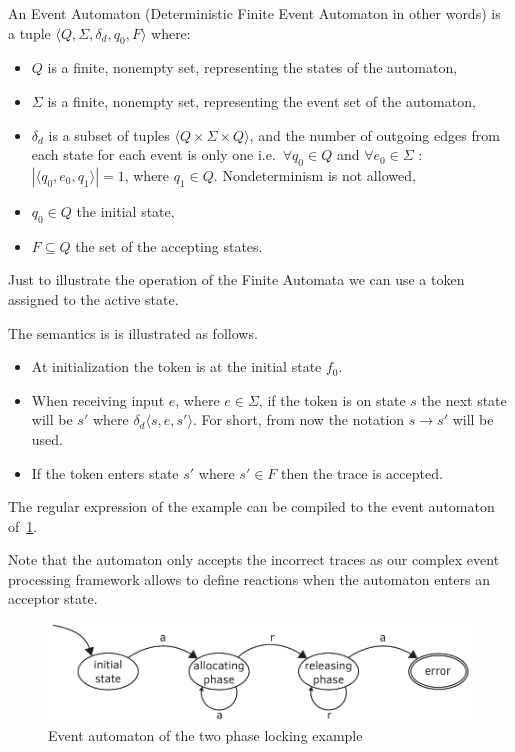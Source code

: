 			
			\begin{dfn}
				\label{dfn:cep:ea}
				An Event Automaton (Deterministic Finite Event Automaton in other words) is a tuple $\langle Q,\Sigma,\delta_d,q_0, F \rangle$\citep{lam2006compilers} where: 
					\begin{itemize}
						\item $Q$ is a finite, nonempty set, representing the states of the automaton,
						\item $\Sigma$ is a finite, nonempty set, representing the event set of the automaton,
						\item $\delta_d$ is a subset of tuples $\langle Q \times \Sigma \times Q \rangle$,
							and the number of outgoing edges from each state for each event is only one 
							i.e.~$\forall q_0 \in Q$ and $\forall e_0 \in \Sigma$ : $|\langle q_0, e_0, q_1 \rangle| = 1$, where $q_1 \in Q$. Nondeterminism is not allowed,
						\item $q_0 \in Q$ the initial state,
						\item $F \subseteq Q$ the set of the accepting states.
					\end{itemize}	
			\end{dfn}
			
			Just to illustrate the operation of the Finite Automata we can use a token assigned to the active state.

			The semantics is is illustrated as follows. 
			\begin{itemize}
				\item At initialization the token is at the initial state $f_0$.
				\item When receiving input $e$, where $e \in \Sigma$, if the token is on state $s$ the next state will be $s'$ where
				$\delta_d \langle s,e,s' \rangle$. For short, from now the notation $s \rightarrow s'$ will be used. 
				\item If the token enters state $s'$ where $s' \in F$ then the trace is accepted. 			
			\end{itemize}


			The regular expression of the example can be compiled to the event automaton of~\cref{fig:cep:fa}. 

			Note that the automaton only accepts the incorrect traces as our complex event processing framework allows to define reactions when the automaton enters an acceptor state.
			
			\begin{figure}[h]
			\centering
			\includegraphics[width=0.7\linewidth]{figures/chapter_4/allocating_simple}
			\caption{Event automaton of the two phase locking example \redraw}
			\label{fig:cep:fa}
			\end{figure}
			
